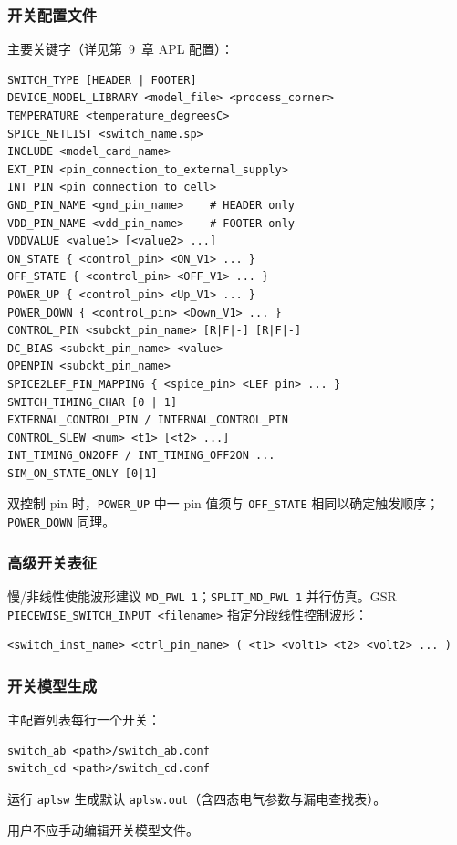 \subsubsection{开关配置文件}
主要关键字（详见第~9~章 APL 配置）：
\begin{lstlisting}
SWITCH_TYPE [HEADER | FOOTER]
DEVICE_MODEL_LIBRARY <model_file> <process_corner>
TEMPERATURE <temperature_degreesC>
SPICE_NETLIST <switch_name.sp>
INCLUDE <model_card_name>
EXT_PIN <pin_connection_to_external_supply>
INT_PIN <pin_connection_to_cell>
GND_PIN_NAME <gnd_pin_name>    # HEADER only
VDD_PIN_NAME <vdd_pin_name>    # FOOTER only
VDDVALUE <value1> [<value2> ...]
ON_STATE { <control_pin> <ON_V1> ... }
OFF_STATE { <control_pin> <OFF_V1> ... }
POWER_UP { <control_pin> <Up_V1> ... }
POWER_DOWN { <control_pin> <Down_V1> ... }
CONTROL_PIN <subckt_pin_name> [R|F|-] [R|F|-]
DC_BIAS <subckt_pin_name> <value>
OPENPIN <subckt_pin_name>
SPICE2LEF_PIN_MAPPING { <spice_pin> <LEF pin> ... }
SWITCH_TIMING_CHAR [0 | 1]
EXTERNAL_CONTROL_PIN / INTERNAL_CONTROL_PIN
CONTROL_SLEW <num> <t1> [<t2> ...]
INT_TIMING_ON2OFF / INT_TIMING_OFF2ON ...
SIM_ON_STATE_ONLY [0|1]
\end{lstlisting}

双控制 pin 时，\texttt{POWER\_UP} 中一 pin 值须与 \texttt{OFF\_STATE} 相同以确定触发顺序；\texttt{POWER\_DOWN} 同理。

\subsubsection{高级开关表征}
慢/非线性使能波形建议 \texttt{MD\_PWL 1}；\texttt{SPLIT\_MD\_PWL 1} 并行仿真。GSR \texttt{PIECEWISE\_SWITCH\_INPUT <filename>} 指定分段线性控制波形：
\begin{lstlisting}
<switch_inst_name> <ctrl_pin_name> ( <t1> <volt1> <t2> <volt2> ... )
\end{lstlisting}

\subsubsection{开关模型生成}
主配置列表每行一个开关：
\begin{lstlisting}
switch_ab <path>/switch_ab.conf
switch_cd <path>/switch_cd.conf
\end{lstlisting}
运行 \texttt{aplsw} 生成默认 \texttt{aplsw.out}（含四态电气参数与漏电查找表）。

\begin{noteBox}
用户不应手动编辑开关模型文件。
\end{noteBox}

